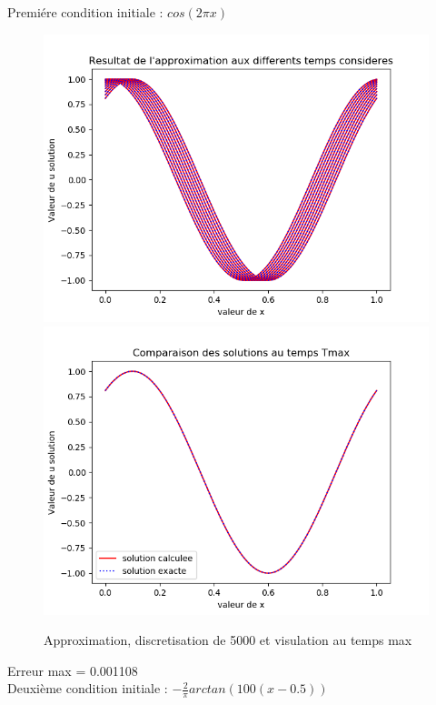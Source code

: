 \documentclass[12pt]{article}
\begin{document}
Premiére condition initiale : $cos(2 \pi x)$
 \begin{figure}[H]
	\centering
	\includegraphics[scale=0.40]{1D_c1_5000_s2_init1.png}
	\includegraphics[scale=0.40]{Temp_max_c1_5000_s2_i1.png}
	\caption{Approximation, discretisation de 5000 et visulation au temps max}
	\label{1D} 
	\end{figure}
Erreur max = 0.001108
\\Deuxième condition initiale : $-\frac{2}{\pi}arctan(100(x-0.5))$
\end{document}

